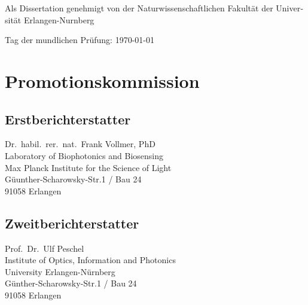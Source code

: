 \begin{otherlanguage}{german}
Als Dissertation genehmigt von der Naturwissenschaftlichen Fakultät der
Universität Erlangen-Nurnberg\\
\vspace{0.5cm}

Tag der mundlichen Prüfung: \today\\
\vspace{0.5cm}

\section*{Promotionskommission}
\subsection*{Erstberichterstatter}
Dr.~habil.~rer.~nat.~Frank Vollmer, PhD\\
Laboratory of Biophotonics and Biosensing\\
Max Planck Institute for the Science of Light\\
Güunther-Scharowsky-Str.1 / Bau 24\\
91058 Erlangen
\subsection*{Zweitberichterstatter}
Prof.~Dr.~Ulf Peschel\\
Institute of Optics, Information and Photonics\\
University Erlangen-Nürnberg\\
Günther-Scharowsky-Str.1 / Bau 24\\
91058 Erlangen
\end{otherlanguage}
